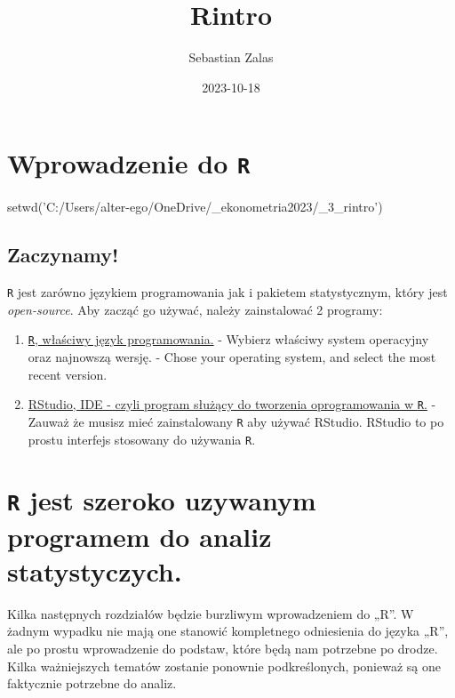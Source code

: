 \documentclass[
]{article}
\title{Rintro}
\author{Sebastian Zalas}
\date{2023-10-18}
\begin{document}
\maketitle

\hypertarget{R-intro}{%
\section{\texorpdfstring{Wprowadzenie do
\texttt{R}}{Wprowadzenie do R}}\label{R-intro}}

setwd('C:/Users/alter-ego/OneDrive/\_ekonometria2023/\_3\_rintro')

\hypertarget{zaczynamy}{%
\subsection{Zaczynamy!}\label{zaczynamy}}

\texttt{R} jest zarówno językiem programowania jak i pakietem
statystycznym, który jest \emph{open-source}. Aby zacząć go używać,
należy zainstalować 2 programy:

\begin{enumerate}
\def\labelenumi{\arabic{enumi}.}
\item
  \href{https://www.r-project.org}{\texttt{R}, właściwy język
  programowania.} - Wybierz właściwy system operacyjny oraz najnowszą
  wersję. - Chose your operating system, and select the most recent
  version.
\item
  \href{http://www.rstudio.com/}{RStudio, IDE - czyli program służący do
  tworzenia oprogramowania w \texttt{R}.} - Zauważ że musisz mieć
  zainstalowany \texttt{R} aby używać RStudio. RStudio to po prostu
  interfejs stosowany do używania \texttt{R}.
\end{enumerate}

\hypertarget{r-jest-szeroko-uzywanym-programem-do-analiz-statystyczych.}{%
\section{\texorpdfstring{\texttt{R} jest szeroko uzywanym programem do
analiz
statystyczych.}{R jest szeroko uzywanym programem do analiz statystyczych.}}\label{r-jest-szeroko-uzywanym-programem-do-analiz-statystyczych.}}

Kilka następnych rozdziałów będzie burzliwym wprowadzeniem do „R''. W
żadnym wypadku nie mają one stanowić kompletnego odniesienia do języka
„R'', ale po prostu wprowadzenie do podstaw, które będą nam potrzebne po
drodze. Kilka ważniejszych tematów zostanie ponownie podkreślonych,
ponieważ są one faktycznie potrzebne do analiz.
\end{document}
